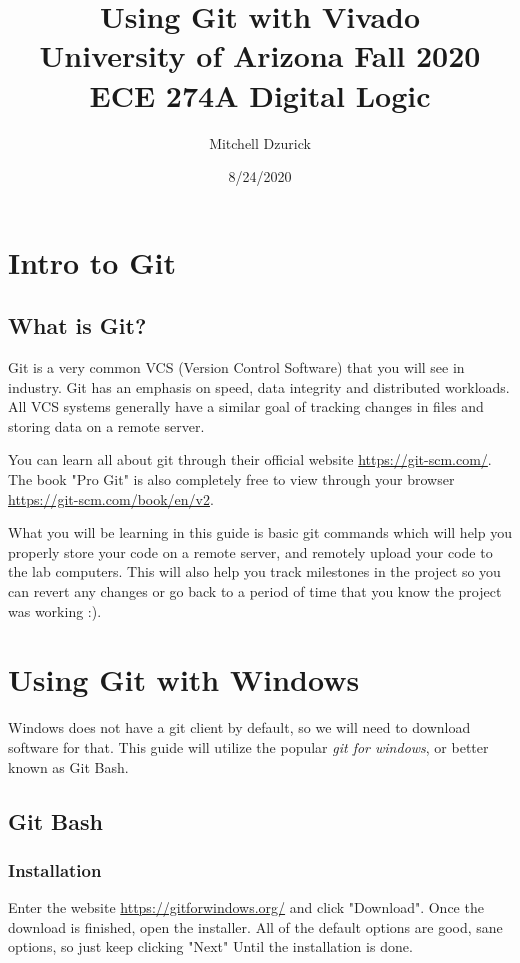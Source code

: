 \documentclass[12pt]{article}
\title {{\bf Using Git with Vivado} \\
\large{University of Arizona Fall 2020 ECE 274A Digital Logic}}
\author{Mitchell Dzurick}
\date{8/24/2020}
\begin{document}
\maketitle

\tableofcontents
\listoffigures
\clearpage

\section{Intro to Git} \label{Intro to Git}
\subsection{What is Git?}
Git is a very common VCS (Version Control Software) that you will see in industry. Git has an emphasis on speed, data integrity and distributed workloads. All VCS systems generally have a similar goal of tracking changes in files and storing data on a remote server.

You can learn all about git through their official website \href{https://git-scm.com/}{https://git-scm.com/}. The book "Pro Git" is also completely free to view through your browser \href{https://git-scm.com/book/en/v2}{https://git-scm.com/book/en/v2}.

What you will be learning in this guide is basic git commands which will help you properly store your code on a remote server, and remotely upload your code to the lab computers. This will also help you track milestones in the project so you can revert any changes or go back to a period of time that you know the project was working :).



\section{Using Git with Windows} \label{Using Git with Windows}
Windows does not have a git client by default, so we will need to download software for that. This guide will utilize the popular \emph{git for windows}, or better known as Git Bash.
\subsection{Git Bash}
\subsubsection{Installation} \label{Win10-GitBashInstall}
Enter the website \url{https://gitforwindows.org/} and click "Download". Once the download is finished, open the installer. All of the default options are good, sane options, so just keep clicking "Next" Until the installation is done.
\end{document}
